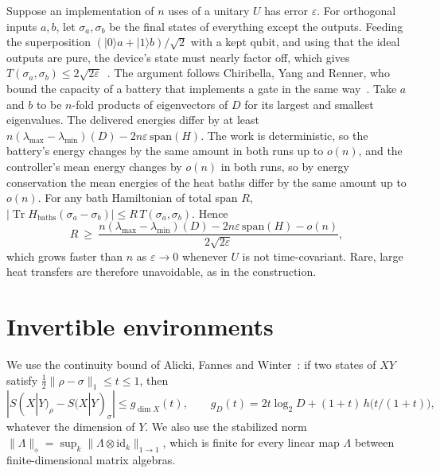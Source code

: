 \documentclass[11pt]{article}
\theoremstyle{definition}
\theoremstyle{remark}
\newcommand{\Tr}{\operatorname{Tr}}
\begin{document}
Suppose an implementation of $n$ uses of a unitary $U$ has error $\varepsilon$. For orthogonal inputs $a,b$, let $\sigma_a,\sigma_b$ be the final states of everything except the outputs. Feeding the superposition $(|0\rangle a+|1\rangle b)/\sqrt2$ with a kept qubit, and using that the ideal outputs are pure, the device's state must nearly factor off, which gives $T(\sigma_a,\sigma_b)\le2\sqrt{2\varepsilon}$~\cite{KSW08}. The argument follows Chiribella, Yang and Renner, who bound the capacity of a battery that implements a gate in the same way~\cite{ChiribellaYangRenner21}. Take $a$ and $b$ to be $n$-fold products of eigenvectors of $D$ for its largest and smallest eigenvalues. The delivered energies differ by at least $n(\lambda_{\max}-\lambda_{\min})(D)-2n\varepsilon\,\mathrm{span}(H)$. The work is deterministic, so the battery's energy changes by the same amount in both runs up to $o(n)$, and the controller's mean energy changes by $o(n)$ in both runs, so by energy conservation the mean energies of the heat baths differ by the same amount up to $o(n)$. For any bath Hamiltonian of total span $R$, $|\Tr H_{\mathrm{baths}}(\sigma_a-\sigma_b)|\le R\,T(\sigma_a,\sigma_b)$. Hence
\[
R\ \ge\ \frac{n(\lambda_{\max}-\lambda_{\min})(D)-2n\varepsilon\,\mathrm{span}(H)-o(n)}{2\sqrt{2\varepsilon}},
\]
which grows faster than $n$ as $\varepsilon\to0$ whenever $U$ is not time-covariant. Rare, large heat transfers are therefore unavoidable, as in the construction.

\section{Invertible environments}\label{app:invertible}

We use the continuity bound of Alicki, Fannes and Winter~\cite{Winter16}: if two states of $XY$ satisfy $\tfrac12\|\rho-\sigma\|_1\le t\le1$, then
\begin{equation}\label{eq:afw}
|S(X|Y)_\rho-S(X|Y)_\sigma|\le g_{\dim X}(t),\qquad g_D(t)=2t\log_2 D+(1+t)\,h\bigl(t/(1+t)\bigr),
\end{equation}
whatever the dimension of $Y$. We also use the stabilized norm $\|\Lambda\|_\diamond=\sup_k\|\Lambda\otimes\mathrm{id}_k\|_{1\to1}$, which is finite for every linear map $\Lambda$ between finite-dimensional matrix algebras.
\end{document}
